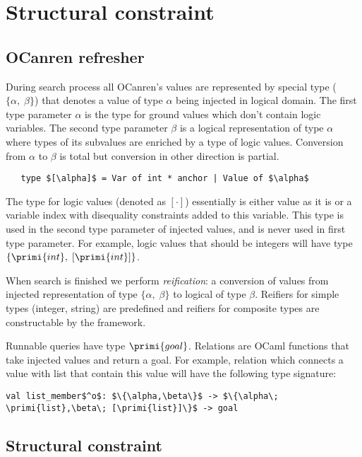 \section{Structural constraint}

\subsection{OCanren refresher}

During search process all OCanren's values are represented by special type ($\{\alpha,\;\beta\}$) that denotes a value of type $\alpha$  being injected in logical domain. The first type parameter $\alpha$ is the type for ground values which don't contain logic variables. The second type parameter $\beta$ is a logical representation of type $\alpha$ where types of its subvalues are enriched by a type of logic values. Conversion from $\alpha$ to $\beta$ is total but conversion in other direction is partial.


\begin{lstlisting}
   type $[\alpha]$ = Var of int * anchor | Value of $\alpha$
\end{lstlisting}

The type for logic values (denoted as $[\cdot]$) essentially is either value as it is or a variable index with disequality constraints added to this variable. This type is used in the second type parameter of injected values, and is never used in first type parameter. For example, logic values that should be integers will have type $\{\primi{int},\;[\primi{int}] \}$.

When search is finished we perform \emph{reification}: a conversion of values from injected representation of type $\{\alpha,\;\beta\}$ to logical of type $\beta$. Reifiers for simple types (integer, string) are predefined and reifiers for composite types are constructable by the framework.

Runnable queries have type $\primi{goal}$. Relations are OCaml functions that take injected values and return a goal. For example, relation which connects a value with list that contain this value will have the following type signature:

\begin{lstlisting}
val list_member$^o$: $\{\alpha,\beta\}$ -> $\{\alpha\; \primi{list},\beta\; [\primi{list}]\}$ -> goal
\end{lstlisting}

\subsection{Structural constraint}

